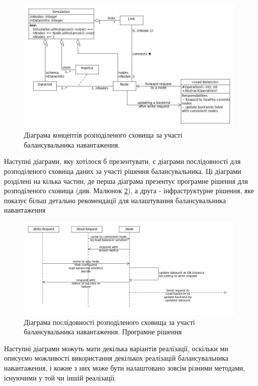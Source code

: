 \documentclass[14pt]{vakthesis}
\begin{document}
\begin{figure}
\centering

\includegraphics[width=\linewidth]{images/d_concept_lb.jpg}
     \caption{Діаграма 	концептів розподіленого сховища за участі балансувальника навантаження.}
     \label{fig:d_concept_lb}
\end{figure}


Наступні діаграми, яку хотілося б презентувати, є діаграми послідовності для розподіленого сховища даних за участі рішення балансувальника.
Ці діаграми розділені на кілька частин, де перша діаграма презентує програмне рішення для розподіленого сховища (див. Малюнок \ref{fig:d_sequence_lb}), а друга - інфраструктурне рішення, яке показує більш детально рекомендації для налаштування балансувальника навантаження

\begin{figure}
\centering

\includegraphics[width=\linewidth]{images/d_sequence_lb.jpg}
     \caption{Діаграма 	послідовності розподіленого сховища за участі балансувальника навантаження. Програмне рішення}
     \label{fig:d_sequence_lb}
\end{figure}

Наступні діаграми можуть мати декілька варіантів реалізації, оскільки ми описуємо можливості використання декількох реалізацій балансувальника навантаження,
і кожне з них може бути налаштовано зовсім різними методами, існуючими у той чи іншій реалізації. 
\end{document}
